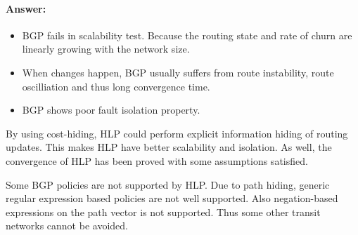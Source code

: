 \documentclass[a4paper,11pt]{article}
\theoremstyle{mytheor}
\begin{document}
\begin{enumerate}
\paragraph{Answer:}
\begin{itemize}
\item BGP fails in scalability test. 
Because the routing state and rate of churn are linearly growing with the network size.
\item When changes happen, BGP usually suffers from route instability, route oscilliation and thus long convergence time.
\item BGP shows poor fault isolation property.
\end{itemize}
By using cost-hiding, HLP could perform explicit information hiding of routing updates.
This makes HLP have better scalability and isolation.
As well, the convergence of HLP has been proved with some assumptions satisfied.

Some BGP policies are not supported by HLP.
Due to path hiding, generic regular expression based policies are not well supported.
Also negation-based expressions on the path vector is not supported. 
Thus some other transit networks cannot be avoided.

\end{enumerate}
\end{document}
